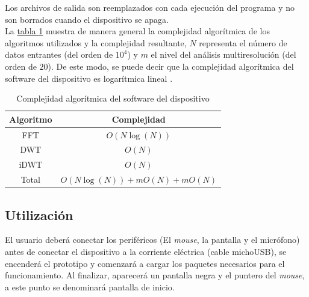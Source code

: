 \documentclass[11pt,lettersize]{article} %
\newcommand{\tabla}[1]{\hyperref[{#1}]{tabla \ref*{#1}}}
\begin{document}
Los archivos de salida son reemplazados con cada ejecución del programa y no son borrados cuando el dispositivo se apaga.\\

La \tabla{T-complejidad} muestra de manera general la complejidad algorítmica de los algoritmos utilizados y la complejidad resultante, $N$ representa el número de datos entrantes (del orden de $10^4$) y $m$ el nivel del análisis multiresolución (del orden de $20$). De este modo, se puede decir que la complejidad algorítmica del software del dispositivo es logarítmica lineal \cite{Arora2009}. \label{S-complejidad}
\begin{table}[H]
	\begin{center}
		\begin{tabular}{|c|c|}
			\hline
			Algoritmo & Complejidad \\ \hline
			FFT\nomenclature{FFT}{Transformada rápida de Fourier, por sus siglas en inglés} & $O(N\log(N))$\cite{Rioul1992} \\ \hline
			DWT & $O(N)$\cite{Rioul1992} \\ \hline
			iDWT\nomenclature{iDWT}{Transformada wavelet discreta inversa, por sus siglas en inglés} & $O(N)$\cite{Rioul1992} \\ \hline
			Total & $O(N\log(N)) + mO(N) + mO(N)$ \\ \hline
		\end{tabular}
	\end{center}
	\caption{Complejidad algorítmica del software del dispositivo}
	\label{T-complejidad}
\end{table}


\subsection{Utilización}
\label{S-utilizacion}
El usuario deberá conectar los periféricos (El \textit{mouse}, la pantalla y el micrófono) antes de conectar el dispositivo a la corriente eléctrica (cable michoUSB), se encenderá el prototipo y comenzará a cargar los paquetes necesarios para el funcionamiento. Al finalizar, aparecerá un pantalla negra y el puntero del \textit{mouse}, a este punto se denominará pantalla de inicio. \\
\end{document}
